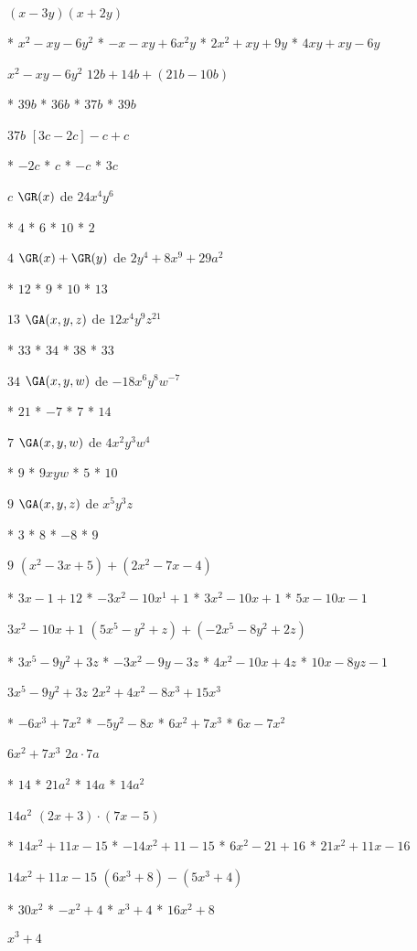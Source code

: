 $(x-3y)(x+2y)$
\begin{enum}
	* $x^2-xy-6y^2$
	* $-x-xy+6x^2y$
	* $2x^2+xy+9y$
	* $4xy+xy-6y$
\end{enum}
$x^2-xy-6y^2$
$12b+14b+(21b-10b)$
\begin{enum}
	* $39b$
	* $36b$
	* $37b$
	* $39b$
\end{enum}
$37b$
$[3c-2c]-c+c$
\begin{enum}
	* $-2c$
	* $c$
	* $-c$
	* $3c$
\end{enum}
$c$
$\GR(x)$ de $24x^4y^6$
\begin{enum}
	* $4$
	* $6$
	* $10$
	* $2$
\end{enum}
$4$
$\GR(x)+\GR(y)$ de $2y^4+8x^9+29a^2$
\begin{enum}
	* $12$
	* $9$
	* $10$
	* $13$
\end{enum}
$13$
$\GA(x,y,z)$ de $12x^4y^9z^{21}$
\begin{enum}
	* $33$
	* $34$
	* $38$
	* $33$
\end{enum}
$34$
$\GA(x,y,w)$ de $-18x^6y^8w^{-7}$
\begin{enum}
	* $21$
	* $-7$
	* $7$
	* $14$
\end{enum}
$7$
$\GA(x,y,w)$ de $4x^2y^3w^4$
\begin{enum}
	* $9$
	* $9xyw$
	* $5$
	* $10$
\end{enum}
$9$
$\GA(x,y,z)$ de $x^5y^3z$
\begin{enum}
	* $3$
	* $8$
	* $-8$
	* $9$
\end{enum}
$9$
$\left(x^2-3x+5\right)+\left(2x^2-7x-4\right)$
\begin{enum}
	* $3x-1+12$
	* $-3x^2-10x^1+1$
	* $3x^2-10x+1$
	* $5x-10x-1$
\end{enum}
$3x^2-10x+1$
$\left(5x^5-y^2+z\right)+\left(-2x^5-8y^2+2z\right)$
\begin{enum}
	* $3x^5-9y^2+3z$
	* $-3x^2-9y-3z$
	* $4x^2-10x+4z$
	* $10x-8yz-1$
\end{enum}
$3x^5-9y^2+3z$
$2x^2+4x^2-8x^3+15x^3$
\begin{enum}
	* $-6x^3+7x^2$
	* $-5y^2-8x$
	* $6x^2+7x^3$
	* $6x-7x^2$
\end{enum}
$6x^2+7x^3$
$2a\cdot 7a$
\begin{enum}
	* $14$
	* $21a^2$
	* $14a$
	* $14a^2$
\end{enum}
$14a^2$
$(2x+3)\cdot(7x-5)$
\begin{enum}
	* $14x^2+11x-15$
	* $-14x^2+11-15$
	* $6x^2-21+16$
	* $21x^2+11x-16$
\end{enum}
$14x^2+11x-15$
$\left(6x^3+8\right)-\left(5x^3+4\right)$
\begin{enum}
	* $30x^2$
	* $-x^2+4$
	* $x^3+4$
	* $16x^2+8$
\end{enum}
$x^3+4$
